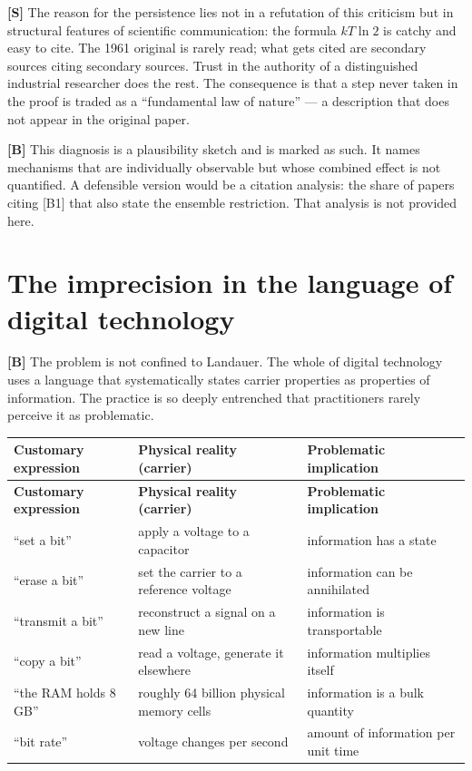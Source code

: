 \textbf{[S]} The reason for the persistence lies not in a refutation of this criticism but
in structural features of scientific communication: the formula $kT\ln 2$ is
catchy and easy to cite. The 1961 original is rarely read; what gets cited are
secondary sources citing secondary sources. Trust in the authority of a
distinguished industrial researcher does the rest. The consequence is that a step
never taken in the proof is traded as a “fundamental law of nature” --- a
description that does not appear in the original paper.

\textbf{[B]} This diagnosis is a plausibility sketch and is marked as such. It names
mechanisms that are individually observable but whose combined effect is not
quantified. A defensible version would be a citation analysis: the share of papers
citing [B1] that also state the ensemble restriction. That analysis is not
provided here.

\section{The imprecision in the language of digital technology}

\textbf{[B]} The problem is not confined to Landauer. The whole of digital technology uses a
language that systematically states carrier properties as properties of
information. The practice is so deeply entrenched that practitioners rarely
perceive it as problematic.

\begin{center}
\small
\begin{longtable}{@{}p{}p{}p{}@{}}
\toprule
\textbf{Customary expression} & \textbf{Physical reality (carrier)} & \textbf{Problematic implication} \\
\midrule
\endfirsthead
\toprule
\textbf{Customary expression} & \textbf{Physical reality (carrier)} & \textbf{Problematic implication} \\
\midrule
\endhead
“set a bit” & apply a voltage to a capacitor & information has a state \\
“erase a bit” & set the carrier to a reference voltage & information can be annihilated \\
“transmit a bit” & reconstruct a signal on a new line & information is transportable \\
“copy a bit” & read a voltage, generate it elsewhere & information multiplies itself \\
“the RAM holds 8\,GB” & roughly 64 billion physical memory cells & information is a bulk quantity \\
“bit rate” & voltage changes per second & amount of information per unit time \\
\bottomrule
\end{longtable}
\end{center}

